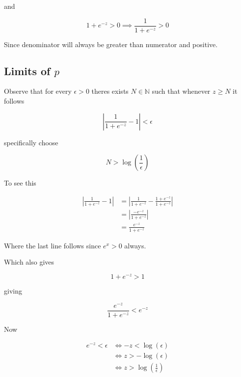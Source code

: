 \documentclass{article}
\theoremstyle{remark}
\begin{document}
and

\begin{equation*}
1 + e^{-z} > 0 \implies \frac{1}{1 + e^{-z}} > 0
\end{equation*}

Since denominator will always be greater than numerator and positive.

\subsection{Limits of $p$}

Observe that for every $\epsilon > 0$ theres exists $N \in \mathbb{N}$ such that whenever
$z \geq N$ it follows

\begin{equation*}
    \left|\frac{1}{1 + e^{-z}} - 1\right| < \epsilon
\end{equation*}

specifically choose

\begin{equation*}
    N > \log\!\left(\dfrac{1}{\epsilon}\right)
\end{equation*}

To see this

\begin{align*}
\left|\frac{1}{1 + e^{-z}} - 1\right|
  &= \left|\frac{1}{1 + e^{-z}} - \frac{1 + e^{-z}}{1 + e^{-z}}\right| \\
  &= \left|\frac{-e^{-z}}{1 + e^{-z}}\right| \\
  &= \frac{e^{-z}}{1 + e^{-z}}
\end{align*}

Where the last line follows since $e^{x} > 0$ always.

Which also gives

\begin{equation*}
    {1 + e^{-z}} > 1
\end{equation*}

giving 

\begin{equation*}
    \frac{e^{-z}}{1 + e^{-z}} < e^{-z} 
\end{equation*}

Now 

\begin{align*}
e^{-z} < \epsilon
  &\iff -z < \log\!\left(\epsilon\right) \\
  &\iff z > -\log\!\left(\epsilon\right) \\
  &\iff z > \log\!\left(\frac{1}{\epsilon}\right)
\end{align*}
\end{document}
